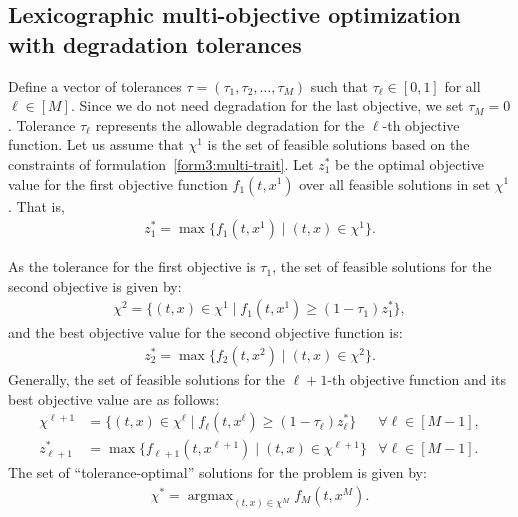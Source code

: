 \documentclass[12pt, a4paper, bibliography=totoc]{scrartcl}
\DeclareMathOperator*{\argmaxB}{argmax}
\begin{document}
\subsection*{Lexicographic multi-objective optimization with degradation tolerances}

Define a vector of tolerances $\tau = (\tau_1,\tau_2,\dots,\tau_M)$ such that $\tau_\ell\in [0,1]$ for all $\ell\in [M]$. Since we do not need degradation for the last objective, we set $\tau_M=0$. Tolerance $\tau_\ell$ represents the allowable degradation for the $\ell$-th objective function. Let us assume that  $\chi^1$ is the set of  feasible solutions based on the constraints of  formulation~\eqref{form3:multi-trait}. Let $z^*_1$ be the optimal objective value for the first objective function $f_1(t,x^1)$ over all feasible solutions in set $\chi^1$. That is,
\begin{align}\label{eq.z*1}
    z^*_1=\max\{f_1(t,x^1) \mid (t,x)\in \chi^1\}.
\end{align}

As the tolerance for the first objective is $\tau_1$, the set of feasible solutions for the second objective is given by:
\begin{align}\label{eq.P2}
    \chi^2=\{(t,x)\in \chi^1 \mid f_1(t,x^1) \ge (1-\tau_1)z^*_1\},
\end{align}
and the best objective value for the second objective function is:
\begin{align}\label{eq.z*2}
    z^*_2=\max\{f_2(t,x^2) \mid (t,x)\in \chi^2\}.    
\end{align}
Generally, the set of feasible solutions for the $\ell+1$-th objective function and its best objective value  are as follows:
\begin{align}
    \chi^{\ell+1}&=\{(t,x)\in \chi^{\ell} \mid f_{\ell}(t,x^{\ell}) \ge (1-\tau_{\ell})z^*_{\ell}\}&  \forall \ell \in [M-1], \label{eq.Pl}\\
    z^*_{\ell+1}&=\max\{f_{\ell+1}(t,x^{\ell+1}) \mid (t,x)\in \chi^{\ell+1}\} &  \forall \ell \in [M-1].\label{eq.z*l}
\end{align}
The set of ``tolerance-optimal'' solutions for the problem is given by:
\begin{align}\label{eq.P*}
    \chi^*= \argmaxB_{(t,x)\in \chi^{M}} f_M(t,x^M).
\end{align}
\end{document}
